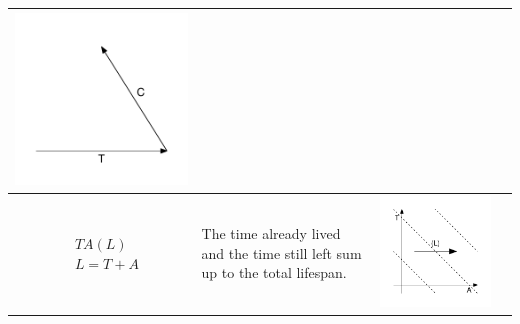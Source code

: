 \documentclass[11pt,oneside,a4paper]{article} %
\begin{document}
\begin{center}
\begin{longtable}{m{}m{}m{}m{}}
  \includegraphics[width = \linewidth]{Figures/JonasTable/CT_iso.pdf}  \\
  \midrule
  $$\begin{aligned}
    &TA(L) \\
    &L = T + A
  \end{aligned}$$ &
  The time already lived and the time still left sum up to the total lifespan. &
  \includegraphics[width = \linewidth]{Figures/JonasTable/TAl.pdf} &

\end{longtable}
\end{center}
\end{document}
